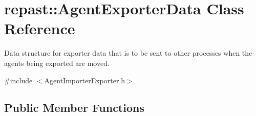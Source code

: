 \hypertarget{classrepast_1_1_agent_exporter_data}{\section{repast\-:\-:Agent\-Exporter\-Data Class Reference}
\label{classrepast_1_1_agent_exporter_data}
}


Data structure for exporter data that is to be sent to other processes when the agents being exported are moved.  




{\ttfamily \#include $<$Agent\-Importer\-Exporter.\-h$>$}

\subsection*{Public Member Functions}
